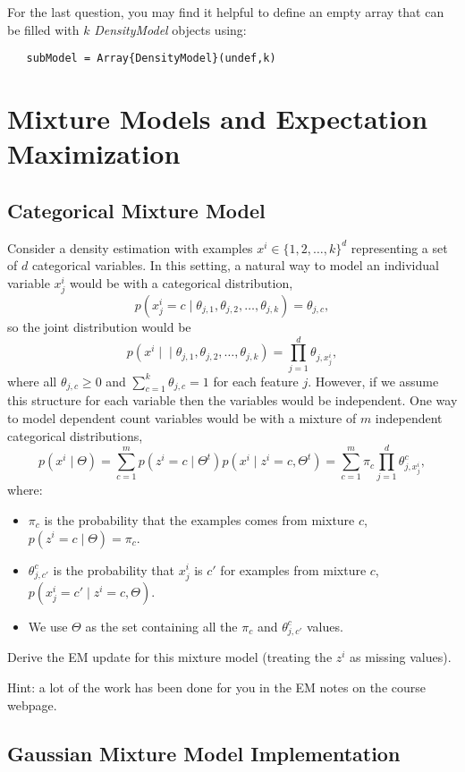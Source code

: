 \documentclass{article}
\def\ans#1{\par\gre{Answer: #1}}
\def\blu#1{{\color{blu}#1}}
\def\gre#1{{\color{gre}#1}}
\def\cond{\; | \;}
\def\items#1{\begin{itemize}#1\end{itemize}}
\begin{document}
For the last question, you may find it helpful to define an empty array that can be filled with $k$ \emph{DensityModel} objects  using:
\begin{verbatim}
   subModel = Array{DensityModel}(undef,k)
\end{verbatim}

\def\ans#1{} %

\section{Mixture Models and Expectation Maximization}


\subsection{Categorical Mixture Model}

Consider a density estimation with examples $x^i \in \{1,2,\dots,k\}^d$ representing a set of $d$ categorical variables. In this setting, a natural way to model an individual variable $x^i_j$ would be with a categorical distribution,
\[
p(x^i_j = c \cond \theta_{j,1}, \theta_{j,2}, \dots, \theta_{j,k}) = \theta_{j,c},
\]
so the joint distribution would be
\[
p(x^i \cond \cond \theta_{j,1}, \theta_{j,2}, \dots, \theta_{j,k}) = \prod_{j=1}^d \theta_{j,x^i_j},
\]
where all $\theta_{j,c} \geq 0$ and $\sum_{c=1}^k \theta_{j,c} = 1$ for each feature $j$.
However, if we assume this structure for each variable then the variables would be independent. One way to model dependent count variables would be with a mixture of $m$ independent categorical distributions,
\[
p(x^i\cond  \Theta) = \sum_{c=1}^{m}p(z^i = c\cond \Theta^t)p(x^i \cond z^i = c, \Theta^t) =  \sum_{c = 1}^m \pi_c \prod_{j=1}^d \theta_{j,x_j^i}^{c},
\]
where:
\items{
\item $\pi_c$ is the probability that the examples comes from mixture $c$, $p(z^i = c \cond \Theta) = \pi_c$. 
\item $\theta_{j,c'}^c$ is the probability that $x_j^i$ is $c'$ for examples from mixture $c$, $p(x_j^i = c' \cond z^i = c, \Theta)$.
\item We use $\Theta$ as the set containing all the $\pi_c$ and $\theta_{j,c'}^c$ values.
}
\blu{Derive the EM update for this mixture model} (treating the $z^i$ as missing values).

Hint: a lot of the work has been done for you in the EM notes on the course webpage.

\subsection{Gaussian Mixture Model Implementation}
\end{document}
